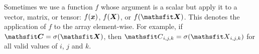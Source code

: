 Sometimes we use a function $f$ whose argument is a scalar but apply
it to a vector, matrix, or tensor: $f({\bm{x}})$, $f({\bm{X}})$, or $f(\tX)$.
This denotes the application of $f$ to the
array element-wise. For example, if $\tC = \sigma(\tX)$, then $\etC_{i,j,k} = \sigma(\etX_{i,j,k})$
for all valid values of $i$, $j$ and $k$.

\clearpage